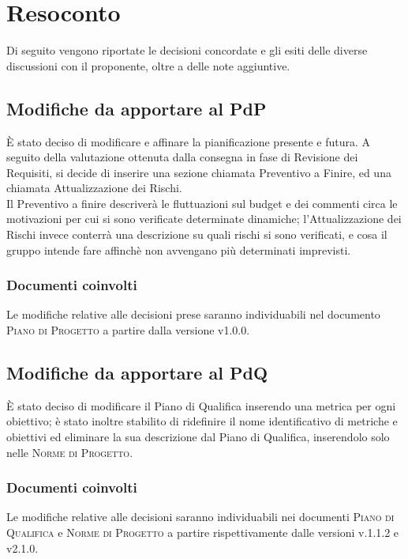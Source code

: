 \documentclass{article}
\begin{document}
\section{Resoconto}
\label{sec:resoconto}

Di seguito vengono riportate le decisioni concordate e gli esiti delle diverse discussioni con il proponente, oltre a
delle note aggiuntive.

\subsection{Modifiche da apportare al PdP}
\label{itm:1}

È stato deciso di modificare e affinare la pianificazione presente e futura. A seguito della valutazione ottenuta dalla consegna in fase di Revisione dei Requisiti, si decide di inserire una sezione chiamata Preventivo a Finire, ed una chiamata Attualizzazione dei Rischi. \\
Il Preventivo a finire descriverà le fluttuazioni sul budget e dei commenti circa le motivazioni per cui si sono verificate determinate dinamiche; l’Attualizzazione dei Rischi invece conterrà una descrizione su quali rischi si sono verificati, e cosa il gruppo intende fare affinchè non avvengano più determinati imprevisti.

\subsubsection*{Documenti coinvolti}
Le modifiche relative alle decisioni prese saranno individuabili nel documento \textsc{Piano di Progetto} a partire
dalla versione v1.0.0.

\subsection{Modifiche da apportare al PdQ}
\label{itm:2}

È stato deciso di modificare il Piano di Qualifica inserendo una metrica per ogni obiettivo; è stato inoltre stabilito di ridefinire il nome identificativo di metriche e obiettivi ed eliminare la sua descrizione dal Piano di Qualifica, inserendolo solo nelle \textsc{Norme di Progetto}.\\

\subsubsection*{Documenti coinvolti}
Le modifiche relative alle decisioni saranno individuabili nei documenti \textsc{Piano di Qualifica} e \textsc{Norme di Progetto} a partire rispettivamente dalle versioni v.1.1.2 e v2.1.0.
\end{document}
